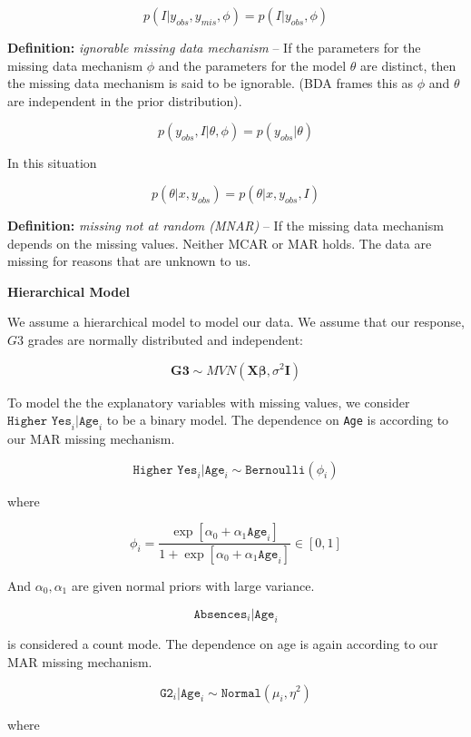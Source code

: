\documentclass[11pt]{article}
\begin{document}
$$p(I|y_{obs}, y_{mis}, \phi) = p(I|y_{obs}, \phi)$$

\vspace{0.25in}

\textbf{Definition:} \textit{ignorable missing data mechanism} -- If the parameters for the missing data mechanism $\phi$ and the parameters for the model $\theta$ are distinct, then the missing data mechanism is said to be ignorable. (BDA frames this as $\phi$ and $\theta$ are independent in the prior distribution). 

$$p(y_{obs},I|\theta, \phi) = p(y_{obs}|\theta)$$

In this situation

$$p(\theta|x, y_{obs}) = p(\theta|x, y_{obs}, I)$$

\vspace{0.25in}

\textbf{Definition:} \textit{missing not at random (MNAR)} -- If the missing data mechanism depends on the missing values. Neither MCAR or MAR holds. The data are missing for reasons that are unknown to us. 

\vspace{0.5in}

\textbf{Hierarchical Model}

We assume a hierarchical model to model our data. We assume that our response, $G3$ grades are normally distributed and independent:

$$\mathbf{G3} \sim MVN(\mathbf{X}\mathbf{\beta}, \sigma^2\mathbf{I})$$

To model the the explanatory variables with missing values, we consider $\texttt{Higher Yes}_i|\texttt{Age}_i$ to be a binary model. The dependence on \texttt{Age} is according to our MAR missing mechanism.

$$\texttt{Higher Yes}_i|\texttt{Age}_i \sim \texttt{Bernoulli}(\phi_i)$$

where

$$\phi_i=\frac{\exp[\alpha_0+\alpha_1\texttt{Age}_i]}{1+\exp[\alpha_0+\alpha_1\texttt{Age}_i]} \in [0,1]$$

And $\alpha_0, \alpha_1$ are given normal priors with large variance.

$$\texttt{Absences}_i|\texttt{Age}_i$$

is considered a count mode. The dependence on age is again according to our MAR missing mechanism. 

$$\texttt{G2}_i|\texttt{Age}_i \sim \texttt{Normal}(\mu_i, \eta^2)$$

where
\end{document}
